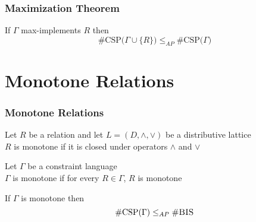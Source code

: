 \documentclass[a4paper,handout]{beamer}
\newcommand{\ccsp}{\#CSP}
\newcommand{\cbis}{\#\textsc{BIS}}
\newcommand{\aple}{\le_{AP}}
\theoremstyle{definition}
\begin{document}
\begin{frame}
\frametitle{Maximization Theorem}
\begin{theorem}
If \(\Gamma\) \textcolor{mygreen}{max-implements} \(R\) then
\[\mathrm{\#CSP(}\Gamma \cup \{R\}\mathrm{)} \aple \mathrm{\#CSP(}\Gamma\mathrm{)}\]
\end{theorem}
\end{frame}

\section{Monotone Relations}

\begin{frame}
\frametitle{Monotone Relations}
\begin{definition}
Let \(R\) be a relation and let \(L=(D, \wedge, \vee)\) be a \textcolor{mygreen}{distributive lattice}\\
\(R\) is \textcolor{mygreen}{monotone} if it is closed under operators \(\wedge\) and \(\vee\) 
\end{definition}
\pause

\begin{definition}
Let \(\Gamma\) be a constraint language\\
\(\Gamma\) is monotone if for every \(R\in \Gamma\), \(R\) is monotone
\end{definition}
\pause

\begin{theorem} 
If \(\Gamma\) is monotone then
\[\mathrm{\ccsp(}\Gamma\mathrm{)}\aple\mathrm{\cbis}\]
\end{theorem}
\end{frame}
\end{document}
